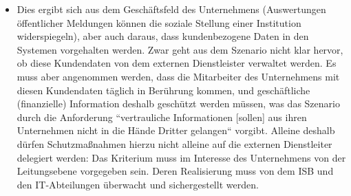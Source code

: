 \begin{itemize}
    \item[] Dies ergibt sich aus dem Geschäftsfeld des Unternehmens (Auswertungen öffentlicher Meldungen können die soziale Stellung einer Institution widerspiegeln), aber auch daraus, dass kundenbezogene Daten in den Systemen vorgehalten werden. Zwar geht aus dem Szenario nicht klar hervor, ob diese Kundendaten von dem externen Dienstleister verwaltet werden. Es muss aber angenommen werden, dass die Mitarbeiter des Unternehmens mit diesen Kundendaten täglich in Berührung kommen, und geschäftliche (finanzielle) Information deshalb geschützt werden müssen, was das Szenario durch die Anforderung ``vertrauliche Informationen [sollen] aus ihren Unternehmen nicht in die Hände Dritter gelangen`` vorgibt. Alleine deshalb dürfen Schutzmaßnahmen hierzu nicht alleine auf die externen Dienstleiter delegiert werden: Das Kriterium muss im Interesse des Unternehmens von der Leitungsebene vorgegeben sein. Deren Realisierung muss von dem ISB und den IT-Abteilungen überwacht und sichergestellt werden.
\end{itemize}

